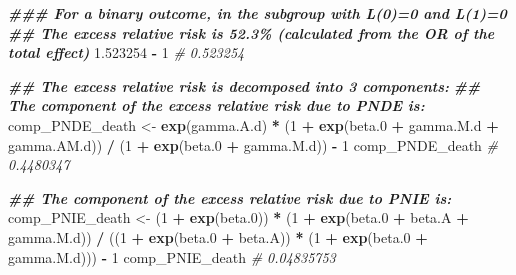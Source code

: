 \documentclass[
]{book}
\newenvironment{Shaded}{\begin{snugshade}}{\end{snugshade}}
\newcommand{\CommentTok}[1]{\textcolor[rgb]{0.56,0.35,0.01}{\textit{#1}}}
\newcommand{\DecValTok}[1]{\textcolor[rgb]{0.00,0.00,0.81}{#1}}
\newcommand{\DocumentationTok}[1]{\textcolor[rgb]{0.56,0.35,0.01}{\textbf{\textit{#1}}}}
\newcommand{\FloatTok}[1]{\textcolor[rgb]{0.00,0.00,0.81}{#1}}
\newcommand{\FunctionTok}[1]{\textcolor[rgb]{0.13,0.29,0.53}{\textbf{#1}}}
\newcommand{\NormalTok}[1]{#1}
\newcommand{\OtherTok}[1]{\textcolor[rgb]{0.56,0.35,0.01}{#1}}
\newcommand{\SpecialCharTok}[1]{\textcolor[rgb]{0.81,0.36,0.00}{\textbf{#1}}}
\begin{document}
\begin{Shaded}
\begin{Highlighting}[]
\DocumentationTok{\#\#\# For a binary outcome, in the subgroup with L(0)=0 and L(1)=0}
\DocumentationTok{\#\# The excess relative risk is 52.3\% (calculated from the OR of the total effect)}
\FloatTok{1.523254} \SpecialCharTok{{-}} \DecValTok{1}
\CommentTok{\# 0.523254}

\DocumentationTok{\#\# The excess relative risk is decomposed into 3 components:}
\DocumentationTok{\#\# The component of the excess relative risk due to PNDE is:}
\NormalTok{comp\_PNDE\_death }\OtherTok{\textless{}{-}} \FunctionTok{exp}\NormalTok{(gamma.A.d) }\SpecialCharTok{*}\NormalTok{ (}\DecValTok{1} \SpecialCharTok{+} \FunctionTok{exp}\NormalTok{(beta}\FloatTok{.0} \SpecialCharTok{+}\NormalTok{ gamma.M.d }\SpecialCharTok{+}\NormalTok{ gamma.AM.d)) }\SpecialCharTok{/}
\NormalTok{  (}\DecValTok{1} \SpecialCharTok{+} \FunctionTok{exp}\NormalTok{(beta}\FloatTok{.0} \SpecialCharTok{+}\NormalTok{ gamma.M.d)) }\SpecialCharTok{{-}} \DecValTok{1}
\NormalTok{comp\_PNDE\_death}
\CommentTok{\# 0.4480347 }

\DocumentationTok{\#\# The component of the excess relative risk due to PNIE is:}
\NormalTok{comp\_PNIE\_death }\OtherTok{\textless{}{-}}\NormalTok{ (}\DecValTok{1} \SpecialCharTok{+} \FunctionTok{exp}\NormalTok{(beta}\FloatTok{.0}\NormalTok{)) }\SpecialCharTok{*}\NormalTok{ (}\DecValTok{1} \SpecialCharTok{+} \FunctionTok{exp}\NormalTok{(beta}\FloatTok{.0} \SpecialCharTok{+}\NormalTok{ beta.A }\SpecialCharTok{+}\NormalTok{ gamma.M.d)) }\SpecialCharTok{/}
\NormalTok{  ((}\DecValTok{1} \SpecialCharTok{+} \FunctionTok{exp}\NormalTok{(beta}\FloatTok{.0} \SpecialCharTok{+}\NormalTok{ beta.A)) }\SpecialCharTok{*}\NormalTok{ (}\DecValTok{1} \SpecialCharTok{+} \FunctionTok{exp}\NormalTok{(beta}\FloatTok{.0} \SpecialCharTok{+}\NormalTok{ gamma.M.d))) }\SpecialCharTok{{-}} \DecValTok{1}
\NormalTok{comp\_PNIE\_death}
\CommentTok{\# 0.04835753}


\end{Highlighting}
\end{Shaded}
\end{document}
